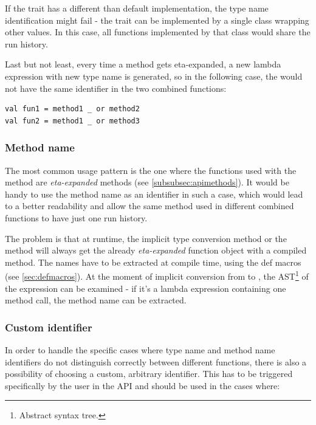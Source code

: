 If the  trait has a different than default implementation, the type name identification might fail - the trait can be implemented by a single class wrapping other values. In this case, all functions implemented by that class would share the run history.

Last but not least, every time a method gets eta-expanded, a new lambda expression with new type name is generated, so in the following case, the  would not have the same identifier in the two combined functions:

\lstset{style=Scala}
\begin{lstlisting}
val fun1 = method1 _ or method2
val fun2 = method1 _ or method3
\end{lstlisting}

\subsubsection{Method name}
\label{subsec:methodnameident}

The most common usage pattern is the one where the functions used with the  method are \textit{eta-expanded} methods (see \ref{subsubsec:apimethods}). It would be handy to use the method name as an identifier in such a case, which would lead to a better readability and allow the same method used in different combined functions to have just one run history.

The problem is that at runtime, the implicit type conversion method or the  method will always get the already \textit{eta-expanded} function object with a compiled  method. The names have to be extracted at compile time, using the def macros (see \ref{sec:defmacros}). At the moment of implicit conversion from  to , the AST\footnote{Abstract syntax tree.} of the  expression can be examined - if it's a lambda expression containing one method call, the method name can be extracted.

\subsubsection{Custom identifier}

In order to handle the specific cases where type name and method name identifiers do not distinguish correctly between different functions, there is also a possibility of choosing a custom, arbitrary identifier. This has to be triggered specifically by the user in the API and should be used in the cases where:

